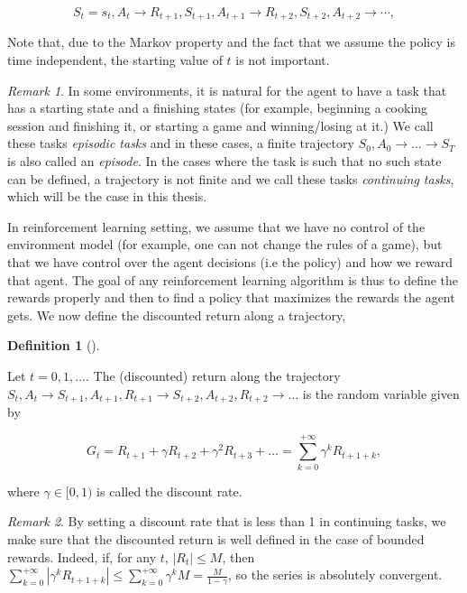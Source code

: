 \documentclass[
  letterpaper,
]{report}
\theoremstyle{definition}
\newtheorem{definition}{Definition}[chapter]
\theoremstyle{plain}
\theoremstyle{definition}
\theoremstyle{remark}
\newtheorem*{remark}{Remark}
\begin{document}
\[
S_t = s_t,A_t \to R_{t+1},S_{t+1},A_{t+1} \to R_{t+2},S_{t+2},A_{t+2} \to \cdots,
\]

Note that, due to the Markov property and the fact that we assume the
policy is time independent, the starting value of \(t\) is not
important.

\begin{remark}
In some environments, it is natural for the agent to have a task that
has a starting state and a finishing states (for example, beginning a
cooking session and finishing it, or starting a game and winning/losing
at it.) We call these tasks \emph{episodic tasks} and in these cases, a
finite trajectory \(S_0,A_0 \to \dots \to S_T\) is also called an
\emph{episode}. In the cases where the task is such that no such state
can be defined, a trajectory is not finite and we call these tasks
\emph{continuing tasks}, which will be the case in this thesis.
\end{remark}

In reinforcement learning setting, we assume that we have no control of
the environment model (for example, one can not change the rules of a
game), but that we have control over the agent decisions (i.e the
policy) and how we reward that agent. The goal of any reinforcement
learning algorithm is thus to define the rewards properly and then to
find a policy that maximizes the rewards the agent gets. We now define
the discounted return along a trajectory,

\begin{definition}[]\protect\hypertarget{def-discount}{}\label{def-discount}

Let \(t = 0, 1, \dots\). The (discounted) return along the trajectory
\(S_t,A_t \to S_{t+1},A_{t+1}, R_{t+1} \to S_{t+2},A_{t+2}, R_{t+2} \to \dots\)
is the random variable given by

\[
G_t = R_{t+1} + \gamma R_{t+2} + \gamma^2 R_{t+3} + \dots = \sum_{k=0}^{+\infty}\gamma^k R_{t+1+k},
\]

where \(\gamma \in [0,1)\) is called the discount rate.

\end{definition}

\begin{remark}
By setting a discount rate that is less than 1 in continuing tasks, we
make sure that the discounted return is well defined in the case of
bounded rewards. Indeed, if, for any \(t\), \(|R_t|\leq M\), then
\(\sum_{k=0}^{+\infty}|\gamma^k R_{t+1+k}| \leq  \sum_{k=0}^{+\infty}\gamma^k M = \frac{M}{1-\gamma}\),
so the series is absolutely convergent.
\end{remark}
\end{document}
